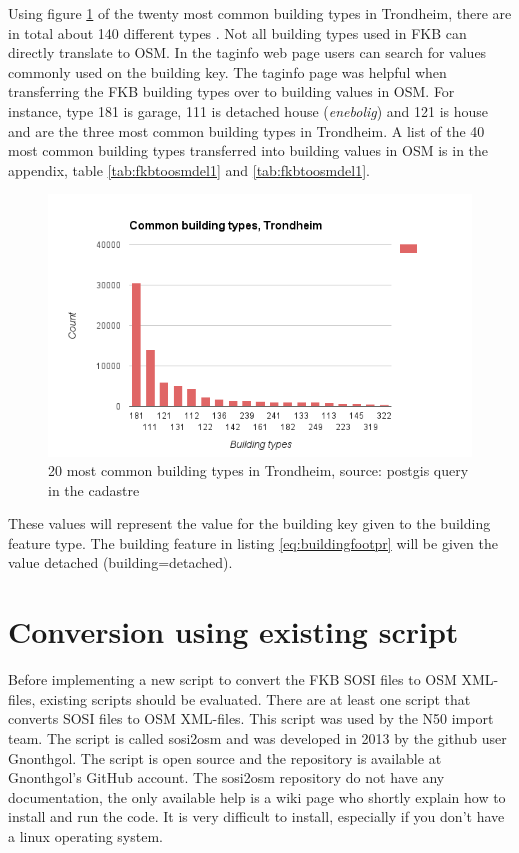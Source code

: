 Using figure \ref{fig:buildtypTrd} of the twenty most common building types in Trondheim, there are in total about 140 different types \cite{SOSI-sekretariatet}. Not all building types used in FKB can directly translate to OSM. In the taginfo web page users can search for values commonly used on the building key. The taginfo page was helpful when transferring the FKB building types over to building values in OSM. For instance, type 181 is garage, 111 is detached house (\textit{enebolig}) and 121 is house and are the three most common building types in Trondheim. A list of the 40 most common building types transferred into building values in OSM is in the appendix, table \ref{tab:fkbtoosmdel1} and \ref{tab:fkbtoosmdel1}. 

\begin{figure}[H]
    \centering
    \includegraphics[scale=0.6]{figures/FixedByMe/buildtypestrd.png}
    \caption{20 most common building types in Trondheim, source: postgis query in the cadastre} 
    \label{fig:buildtypTrd}
\end{figure}

These values will represent the value for the building key given to the building feature type. The building feature in listing \ref{eq:buildingfootpr} will be given the value detached (building=detached).  


\section{Conversion using existing script}\label{sec:sosi2osm}
Before implementing a new script to convert the FKB SOSI files to OSM XML-files, existing scripts should be evaluated. There are at least one script that converts SOSI files to OSM XML-files. This script was used by the N50 import team. The script is called sosi2osm and was developed in 2013 by the github user Gnonthgol.
 The script is open source and the repository is available at Gnonthgol's GitHub account. The sosi2osm repository do not have any documentation, the only available help is a wiki page who shortly explain how to install and run the code. It is very difficult to install, especially if you don't have a linux operating system. 
 
